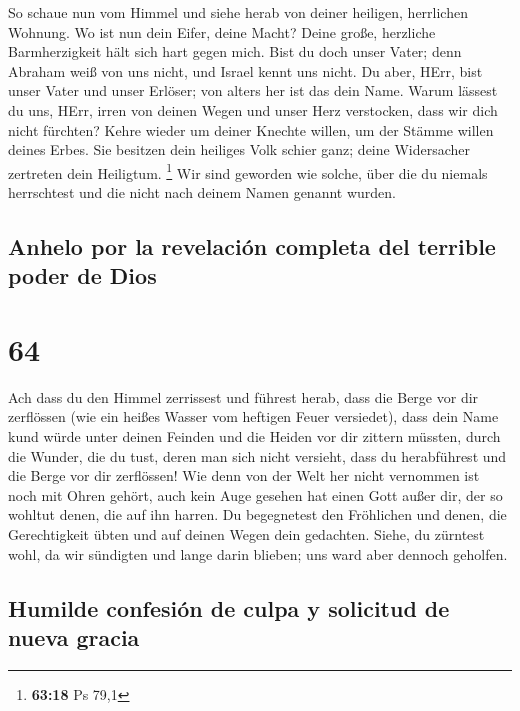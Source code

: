  So schaue nun vom Himmel und siehe herab von deiner
heiligen, herrlichen Wohnung. Wo ist nun dein Eifer, deine Macht? Deine
große, herzliche Barmherzigkeit hält sich hart gegen mich.
 Bist du doch unser Vater; denn Abraham weiß von uns
nicht, und Israel kennt uns nicht. Du aber, HErr, bist unser Vater und
unser Erlöser; von alters her ist das dein Name.  Warum
lässest du uns, HErr, irren von deinen Wegen und unser Herz verstocken,
dass wir dich nicht fürchten? Kehre wieder um deiner Knechte willen, um
der Stämme willen deines Erbes.  Sie besitzen dein
heiliges Volk schier ganz; deine Widersacher zertreten dein Heiligtum.
\footnote{\textbf{63:18} Ps 79,1}  Wir sind geworden wie
solche, über die du niemals herrschtest und die nicht nach deinem Namen
genannt wurden.

\hypertarget{anhelo-por-la-revelaciuxf3n-completa-del-terrible-poder-de-dios}{%
\subsection{Anhelo por la revelación completa del terrible poder de
Dios}\label{anhelo-por-la-revelaciuxf3n-completa-del-terrible-poder-de-dios}}

\hypertarget{section-63}{%
\section{64}\label{section-63}}

 Ach dass du den Himmel zerrissest und führest herab, dass
die Berge vor dir zerflössen (wie ein heißes Wasser vom heftigen Feuer
versiedet), dass dein Name kund würde unter deinen Feinden und die
Heiden vor dir zittern müssten,  durch die Wunder, die du
tust, deren man sich nicht versieht, dass du herabführest und die Berge
vor dir zerflössen!  Wie denn von der Welt her nicht
vernommen ist noch mit Ohren gehört, auch kein Auge gesehen hat einen
Gott außer dir, der so wohltut denen, die auf ihn harren. 
Du begegnetest den Fröhlichen und denen, die Gerechtigkeit übten und auf
deinen Wegen dein gedachten. Siehe, du zürntest wohl, da wir sündigten
und lange darin blieben; uns ward aber dennoch geholfen.

\hypertarget{humilde-confesiuxf3n-de-culpa-y-solicitud-de-nueva-gracia}{%
\subsection{Humilde confesión de culpa y solicitud de nueva
gracia}\label{humilde-confesiuxf3n-de-culpa-y-solicitud-de-nueva-gracia}}

